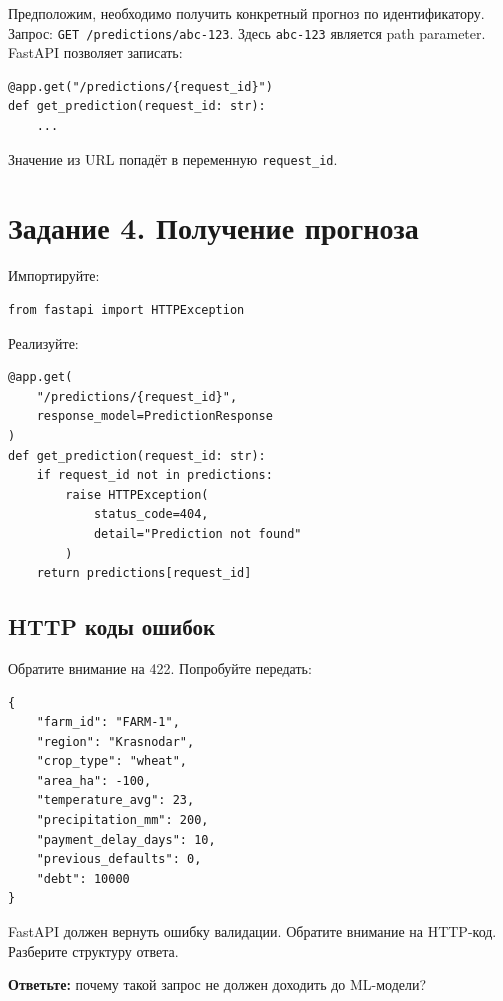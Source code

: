 \documentclass[12pt,a4paper]{article}
\begin{document}
Предположим, необходимо получить конкретный прогноз по идентификатору. Запрос: \texttt{GET /predictions/abc-123}. Здесь \texttt{abc-123} является path parameter. FastAPI позволяет записать:

\begin{lstlisting}[caption={Path parameter}]
@app.get("/predictions/{request_id}")
def get_prediction(request_id: str):
    ...
\end{lstlisting}

Значение из URL попадёт в переменную \texttt{request\_id}.

\section{Задание 4. Получение прогноза}

Импортируйте:

\begin{lstlisting}[caption={Импорт HTTPException}]
from fastapi import HTTPException
\end{lstlisting}

Реализуйте:

\begin{lstlisting}[caption={Endpoint /predictions/\{request\_id\}}]
@app.get(
    "/predictions/{request_id}",
    response_model=PredictionResponse
)
def get_prediction(request_id: str):
    if request_id not in predictions:
        raise HTTPException(
            status_code=404,
            detail="Prediction not found"
        )
    return predictions[request_id]
\end{lstlisting}

\subsection*{HTTP коды ошибок}

Обратите внимание на 422. Попробуйте передать:

\begin{lstlisting}[caption={Некорректные данные}]
{
    "farm_id": "FARM-1",
    "region": "Krasnodar",
    "crop_type": "wheat",
    "area_ha": -100,
    "temperature_avg": 23,
    "precipitation_mm": 200,
    "payment_delay_days": 10,
    "previous_defaults": 0,
    "debt": 10000
}
\end{lstlisting}

FastAPI должен вернуть ошибку валидации. Обратите внимание на HTTP-код. Разберите структуру ответа.

\textbf{Ответьте:} почему такой запрос не должен доходить до ML-модели?
\end{document}
